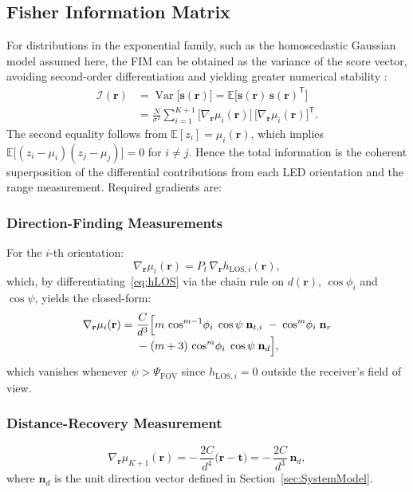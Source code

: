 \documentclass[journal]{IEEEtran}
\newcommand{\deleted}[1]{{\color{red}#1}}
\begin{document}
\deleted{\subsection{Fisher Information Matrix}

For distributions in the exponential family, such as the homoscedastic Gaussian model assumed here, the FIM can be obtained as the variance of the score vector, avoiding second-order differentiation and yielding greater numerical stability \cite{Kay1993}:
\begin{align}
\mathcal{I}(\mathbf r)
&= \operatorname{Var}\!\bigl[\mathbf s(\mathbf r)\bigr]
  = \mathbb{E}\!\bigl[\mathbf s(\mathbf r)\,\mathbf s(\mathbf r)^{\mathsf T}\bigr]
\\
&= \frac{N}{\sigma^{2}}
  \sum_{i=1}^{K+1}
  \bigl[\nabla_{\mathbf r}\mu_i(\mathbf r)\bigr]\,
  \bigl[\nabla_{\mathbf r}\mu_i(\mathbf r)\bigr]^{\!\mathsf T}.
\end{align}
The second equality follows from $\mathbb{E}[z_i]=\mu_i(\mathbf r)$, which implies
$\mathbb{E}\bigl[(z_i-\mu_i)(z_j-\mu_j)\bigr]=0$ for $i\neq j$.  Hence the total information
is the coherent superposition of the differential contributions from each LED orientation and the range measurement. Required gradients are:
\subsubsection{Direction-Finding Measurements}
For the $i$-th orientation:
    \begin{equation}
      \nabla_{\mathbf r}\mu_i(\mathbf r)
      = P_{t}\,\nabla_{\mathbf r}h_{\mathrm{LOS},i}(\mathbf r),
    \end{equation}
which, by differentiating~\eqref{eq:hLOS} via the chain rule on $d(\mathbf r)$, $\cos\phi_i$ and $\cos\psi$, yields the closed-form:
\begin{multline}
    \nabla_{\mathbf r}\mu_i(\mathbf r)
    = \frac{C}{d^{3}}
      \Bigl[
        m\,\cos^{m-1}\!\phi_i\;\cos\psi\;\mathbf n_{t,i}
        \;-\;
        \cos^{m}\!\phi_i\;\mathbf n_{r}
    \\[-3pt]
        \;-\;
        (m+3)\,\cos^{m}\!\phi_i\;\cos\psi\;\mathbf n_{d}
      \Bigr],
\end{multline}
which vanishes whenever $\psi>\Psi_{\mathrm{FOV}}$ since
$h_{\mathrm{LOS},i}=0$ outside the receiver's field of view.

\subsubsection{Distance-Recovery Measurement}
\begin{equation}
      \nabla_{\mathbf r}\mu_{K+1}(\mathbf r)
      = -\,\frac{2C}{d^{4}}\bigl(\mathbf r-\mathbf t\bigr)
      = -\,\frac{2C}{d^{3}}\,\mathbf n_{d},
\end{equation}
where $\mathbf n_{d}$ is the unit direction vector defined in Section~\ref{sec:SystemModel}.}
\end{document}
